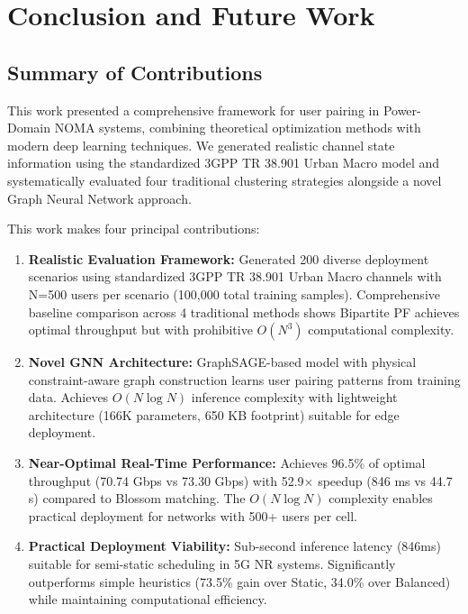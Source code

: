 \section{Conclusion and Future Work}

\subsection{Summary of Contributions}

This work presented a comprehensive framework for user pairing in Power-Domain NOMA systems, combining theoretical optimization methods with modern deep learning techniques. We generated realistic channel state information using the standardized 3GPP TR 38.901 Urban Macro model and systematically evaluated four traditional clustering strategies alongside a novel Graph Neural Network approach.

This work makes four principal contributions:

\begin{enumerate}
    \item \textbf{Realistic Evaluation Framework:} Generated 200 diverse deployment scenarios using standardized 3GPP TR 38.901 Urban Macro channels with N=500 users per scenario (100,000 total training samples). Comprehensive baseline comparison across 4 traditional methods shows Bipartite PF achieves optimal throughput but with prohibitive $O(N^3)$ computational complexity.
    
    \item \textbf{Novel GNN Architecture:} GraphSAGE-based model with physical constraint-aware graph construction learns user pairing patterns from training data. Achieves $O(N \log N)$ inference complexity with lightweight architecture (166K parameters, 650 KB footprint) suitable for edge deployment.
    
    \item \textbf{Near-Optimal Real-Time Performance:} Achieves 96.5\% of optimal throughput (70.74 Gbps vs 73.30 Gbps) with 52.9× speedup (846 ms vs 44.7 s) compared to Blossom matching. The $O(N \log N)$ complexity enables practical deployment for networks with 500+ users per cell.
    
    \item \textbf{Practical Deployment Viability:} Sub-second inference latency (846ms) suitable for semi-static scheduling in 5G NR systems. Significantly outperforms simple heuristics (73.5\% gain over Static, 34.0\% over Balanced) while maintaining computational efficiency.
\end{enumerate}

